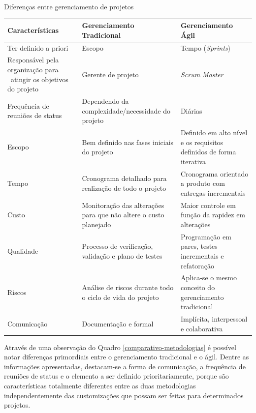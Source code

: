 \begin{quadro}[h]
\centering
{}
\caption{Diferenças entre gerenciamento de projetos}
\vspace{0.5cm}

\setlength{\extrarowheight}{0.25cm}
\begin{tabular}{|L|L|L|}
\hline
\textbf{Características} & \textbf{Gerenciamento Tradicional} & \textbf{Gerenciamento Ágil} \\ %
\hline
Ter definido a priori & Escopo & Tempo (\textit{Sprints})\\
\hline
Responsável pela organização para \ atingir os objetivos do projeto & Gerente de projeto & \textit{Scrum Master}\\
\hline
Frequência de reuniões de status & Dependendo da complexidade/necessidade do projeto & Diárias\\
\hline
Escopo & Bem definido nas fases iniciais do projeto & Definido em alto nível e os requisitos definidos de forma iterativa\\
\hline
Tempo & Cronograma detalhado para realização de todo o projeto & Cronograma orientado a produto com entregas incrementais\\
\hline
Custo & Monitoração das alterações para que não altere o custo planejado & Maior controle em função da rapidez em alterações\\
\hline
Qualidade & Processo de verificação, validação e plano de testes & Programação em pares, testes incrementais e refatoração\\
\hline
Riscos & Análise de riscos durante todo o ciclo de vida do projeto & Aplica-se o mesmo conceito do gerenciamento tradicional\\
\hline
Comunicação & Documentação e formal & Implícita, interpessoal e colaborativa\\

\hline
\end{tabular}
\label{comparativo-metodologias}
\end{quadro}


Através de uma observação do Quadro \ref{comparativo-metodologias} é possível notar diferenças primordiais entre o gerenciamento tradicional e o ágil. Dentre as informações apresentadas, destacam-se a forma de comunicação, a frequência de reuniões de status e o elemento a ser definido prioritariamente, porque são características totalmente diferentes entre as duas metodologias independentemente das customizações que possam ser feitas para determinados projetos. 

